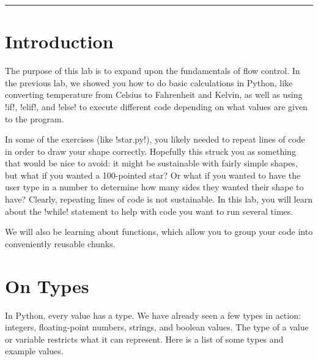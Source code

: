 \documentclass[11pt]{cselabheader}
\begin{document}
\hrule

\section{Introduction}

The purpose of this lab is to expand upon the fundamentals of flow control.
In the previous lab, we showed you how to do basic calculations in Python,
like converting temperature from Celsius to Fahrenheit and Kelvin, as well
as using \pythoninline!if!, \pythoninline!elif!, and \pythoninline!else! to
execute different code depending on what values are given to the program.

In some of the exercises (like \pythoninline!star.py!), you likely needed to
repeat lines of code in order to draw your shape correctly. Hopefully this struck
you as something that would be nice to avoid: it might be sustainable with fairly
simple shapes, but what if you wanted a 100-pointed star? Or what if you wanted to
have the user type in a number to determine how many sides they wanted their shape
to have? Clearly, repeating lines of code is not sustainable. In this lab, you will
learn about the \pythoninline!while! statement to help with code you want to run
several times.

We will also be learning about functions, which allow you to group your code
into conveniently reusable chunks.

\pagebreak

\tableofcontents

\pagebreak

\section{On Types}

In Python, every value has a type.
We have already
seen a few types in action: integers, floating-point numbers, strings, and
boolean values.
The type of a value or variable restricts what it can represent.
Here is a list of some types and example values.


\end{document}
